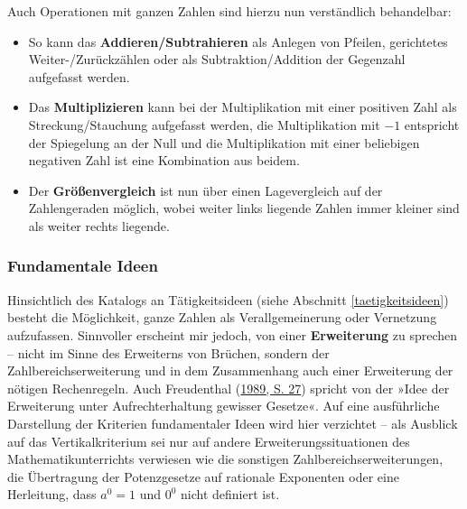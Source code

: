 \documentclass[
]{scrbook}
\providecommand{\tightlist}{%
  \setlength{\itemsep}{0pt}\setlength{\parskip}{0pt}}
\theoremstyle{definition}
\theoremstyle{definition}
\theoremstyle{definition}
\theoremstyle{definition}
\theoremstyle{remark}
\begin{document}
Auch Operationen mit ganzen Zahlen sind hierzu nun verständlich behandelbar:

\begin{itemize}
\tightlist
\item
  So kann das \textbf{Addieren/Subtrahieren} als Anlegen von Pfeilen, gerichtetes Weiter-/Zurückzählen oder als Subtraktion/Addition der Gegenzahl aufgefasst werden.\\
\item
  Das \textbf{Multiplizieren} kann bei der Multiplikation mit einer positiven Zahl als Streckung/Stauchung aufgefasst werden, die Multiplikation mit \(-1\) entspricht der Spiegelung an der Null und die Multiplikation mit einer beliebigen negativen Zahl ist eine Kombination aus beidem.\\
\item
  Der \textbf{Größenvergleich} ist nun über einen Lagevergleich auf der Zahlengeraden möglich, wobei weiter links liegende Zahlen immer kleiner sind als weiter rechts liegende.
\end{itemize}

\hypertarget{ganze-zahlen-fundamentale-ideen}{%
\subsubsection{Fundamentale Ideen}\label{ganze-zahlen-fundamentale-ideen}}

Hinsichtlich des Katalogs an Tätigkeitsideen (siehe Abschnitt \ref{taetigkeitsideen}) besteht die Möglichkeit, ganze Zahlen als Verallgemeinerung oder Vernetzung aufzufassen. Sinnvoller erscheint mir jedoch, von einer \textbf{Erweiterung} zu sprechen -- nicht im Sinne des Erweiterns von Brüchen, sondern der Zahlbereichserweiterung und in dem Zusammenhang auch einer Erweiterung der nötigen Rechenregeln. Auch Freudenthal (\protect\hyperlink{ref-Freudenthal1989}{1989, S. 27}) spricht von der »Idee der Erweiterung unter Aufrechterhaltung gewisser Gesetze«. Auf eine ausführliche Darstellung der Kriterien fundamentaler Ideen wird hier verzichtet -- als Ausblick auf das Vertikalkriterium sei nur auf andere Erweiterungssituationen des Mathematikunterrichts verwiesen wie die sonstigen Zahlbereichserweiterungen, die Übertragung der Potenzgesetze auf rationale Exponenten oder eine Herleitung, dass \(a^0 = 1\) und \(0^0\) nicht definiert ist.
\end{document}
